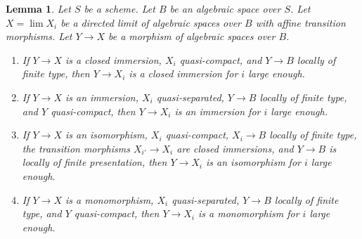 \documentclass{stacks-project}
\theoremstyle{plain}
\newtheorem{lemma}[subsection]{Lemma}
\theoremstyle{definition}
\theoremstyle{remark}
\numberwithin{equation}{subsection}
\def\lim{\mathop{\mathrm{lim}}\nolimits}
\begin{document}
\begin{lemma}
\label{lemma-finite-type-eventually-closed}
Let $S$ be a scheme. Let $B$ be an algebraic space over $S$.
Let $X = \lim X_i$ be a directed limit of
algebraic spaces over $B$ with affine transition morphisms.
Let $Y \to X$ be a morphism of algebraic spaces over $B$.
\begin{enumerate}
\item If $Y \to X$ is a closed immersion, $X_i$ quasi-compact, and
$Y \to B$ locally of finite type, then $Y \to X_i$ is a closed immersion
for $i$ large enough.
\item If $Y \to X$ is an immersion, $X_i$ quasi-separated, $Y \to B$
locally of finite type, and $Y$ quasi-compact, then $Y \to X_i$ is an
immersion for $i$ large enough.
\item If $Y \to X$ is an isomorphism, $X_i$ quasi-compact,
$X_i \to B$ locally of finite type, the transition morphisms
$X_{i'} \to X_i$ are closed immersions, and $Y \to B$ is locally
of finite presentation, then $Y \to X_i$ is an isomorphism for $i$
large enough.
\item If $Y \to X$ is a monomorphism, $X_i$ quasi-separated,
$Y \to B$ locally of finite type, and $Y$ quasi-compact, then
$Y \to X_i$ is a monomorphism for $i$ large enough.
\end{enumerate}
\end{lemma}
\end{document}
